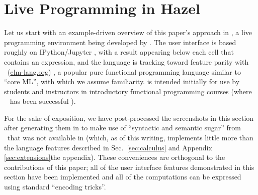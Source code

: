 \newcommand{\examplesSec}{Live Programming in Hazel}
\section{\examplesSec} 
\label{sec:examples}




\newcommand{\overviewExample}[2]{\paragraph{Example {#1}: {#2}}}

Let us start with an example-driven overview of this paper's approach in \Hazel, a live programming environment being developed by \citet{HazelnutSNAPL}. The \Hazel user interface is based roughly on IPython/Jupyter \cite{PER-GRA:2007}, with a result appearing below each cell that contains an expression, and the \Hazel language is tracking toward feature parity with \Elm~(\url{elm-lang.org}) \cite{czaplicki2012elm,Elm}, a popular pure functional programming language similar to ``core ML'', with which we assume familiarity. \Hazel is intended initially for use by students and instructors in introductory functional programming courses (where \Elm~ has been successful \cite{DBLP:journals/corr/abs-1805-05125,zhang2018graphics}). 

For the sake of 
exposition, we have post-processed the screenshots in this section after generating them in \Hazel to make use of  ``syntactic and semantic sugar'' from \Elm~that was not available in \Hazel (which, as of this writing, implements little more than the language features described in Sec.~\ref{sec:calculus} and \ifarxiv Appendix \ref{sec:extensions}\else the appendix\fi). These conveniences are orthogonal to the contributions of this paper; all of the user interface features demonstrated in this section have been implemented and all of the computations can be expressed using standard ``encoding tricks''.







